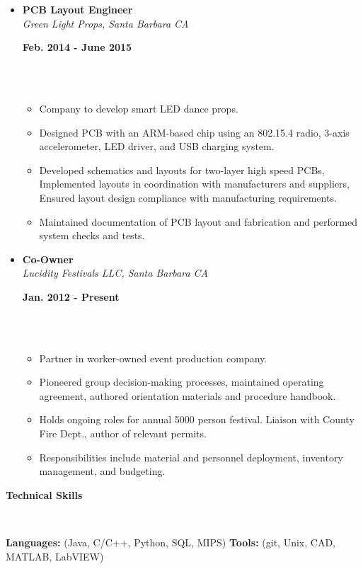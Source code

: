\documentclass[a4paper,11pt]{article}
\newcommand{\isep}{-2 pt}
\newcommand{\lsep}{-0.2cm}
\newcommand{\resheading}[1]{{\small \colorbox{mygrey}{\begin{minipage}{0.975\textwidth}{\textbf{#1 \vphantom{p\^{E}}}}\end{minipage}}}}
\newcommand{\workexp}[4]{
\begin{minipage}[t]{7cm}
\begin{flushleft}
\textbf{#1} \\
\indent \emph{#2}\\
\end{flushleft}
\end{minipage}
\hfill
\begin{minipage}[t]{7cm}
\begin{flushright}
\textbf{#3} \\
\indent #4 \\
\end{flushright}
\end{minipage}
}
\begin{document}
\begin{itemize}
\item
\workexp{PCB Layout Engineer}{Green Light Props, Santa Barbara CA}{Feb. 2014 - June 2015}{}
\\[-0.3cm]
	\begin{itemize}\itemsep \isep
	\item Company to develop smart LED dance props.
	\item Designed PCB with an ARM-based chip using an 802.15.4 radio, 3-axis accelerometer, LED driver, and USB charging system.
	\item Developed schematics and layouts for two-layer high speed PCBs, Implemented layouts in coordination with manufacturers and suppliers, Ensured layout design compliance with manufacturing requirements.
	\item Maintained documentation of PCB layout and fabrication and performed system checks and tests.
	\end{itemize}
\item
\workexp{Co-Owner}{Lucidity Festivals LLC, Santa Barbara CA}{Jan. 2012 - Present}{}
\\[-0.3cm]
	\begin{itemize}\itemsep \isep
	\item Partner in worker-owned event production company.
	\item Pioneered group decision-making processes, maintained operating agreement, authored orientation materials and procedure handbook.
	\item Holds ongoing roles for annual 5000 person festival. Liaison with County Fire Dept., author of relevant permits.
	\item Responsibilities include material and personnel deployment, inventory management, and  budgeting.
	\end{itemize}
\end{itemize}


\resheading{\textbf{Technical Skills} }\\[\lsep]
\begin{itemize}
\noindent \textbf{Languages:} (Java, C/C++, Python, SQL, MIPS)
\textbf{Tools:} (git, Unix, CAD, MATLAB, LabVIEW)
\end{itemize} 


\end{document}
